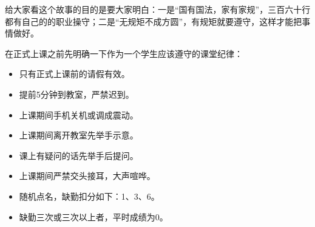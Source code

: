
给大家看这个故事的目的是要大家明白：一是“国有国法，家有家规”，三百六十行都有自己的的职业操守；二是“无规矩不成方圆”，有规矩就要遵守，这样才能把事情做好。

在正式上课之前先明确一下作为一个学生应该遵守的课堂纪律： 

\begin{itemize}
	\item 只有正式上课前的请假有效。
	\item 提前5分钟到教室，严禁迟到。
	\item 上课期间手机关机或调成震动。
	\item 上课期间离开教室先举手示意。
	\item 课上有疑问的话先举手后提问。
	\item 上课期间严禁交头接耳，大声喧哗。
	\item 随机点名，缺勤扣分如下：1、3、6。
	\item 缺勤三次或三次以上者，平时成绩为0。
\end{itemize}

